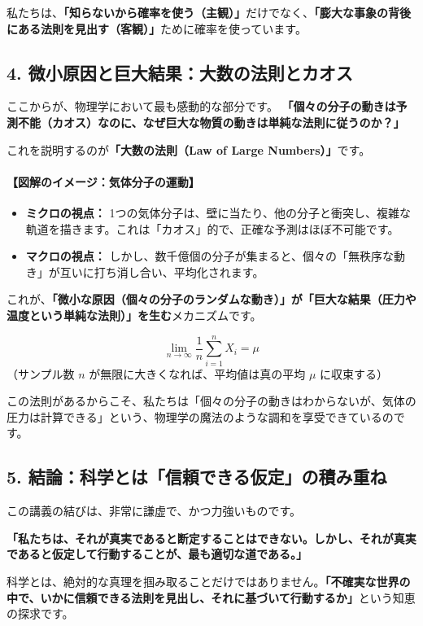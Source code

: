 \documentclass[a4paper,11pt,openany]{ltjsbook}
\begin{document}
\begin{lecturebox}
私たちは、\textbf{「知らないから確率を使う（主観）」}だけでなく、\textbf{「膨大な事象の背後にある法則を見出す（客観）」}ために確率を使っています。

\subsection*{4. 微小原因と巨大結果：大数の法則とカオス}

ここからが、物理学において最も感動的な部分です。
\textbf{「個々の分子の動きは予測不能（カオス）なのに、なぜ巨大な物質の動きは単純な法則に従うのか？」}

これを説明するのが\textbf{「大数の法則（Law of Large Numbers）」}です。

\paragraph{【図解のイメージ：気体分子の運動】}
\begin{itemize}[leftmargin=2em]
\item \textbf{ミクロの視点：} 1つの気体分子は、壁に当たり、他の分子と衝突し、複雑な軌道を描きます。これは「カオス」的で、正確な予測はほぼ不可能です。
\item \textbf{マクロの視点：} しかし、数千億個の分子が集まると、個々の「無秩序な動き」が互いに打ち消し合い、平均化されます。
\end{itemize}

これが、\textbf{「微小な原因（個々の分子のランダムな動き）」が「巨大な結果（圧力や温度という単純な法則）」を生む}メカニズムです。

$$ \lim_{n \to \infty} \frac{1}{n} \sum_{i=1}^{n} X_i = \mu $$
（サンプル数 $n$ が無限に大きくなれば、平均値は真の平均 $\mu$ に収束する）

この法則があるからこそ、私たちは「個々の分子の動きはわからないが、気体の圧力は計算できる」という、物理学の魔法のような調和を享受できているのです。

\subsection*{5. 結論：科学とは「信頼できる仮定」の積み重ね}

この講義の結びは、非常に謙虚で、かつ力強いものです。

\textbf{「私たちは、それが真実であると断定することはできない。しかし、それが真実であると仮定して行動することが、最も適切な道である。」}

科学とは、絶対的な真理を掴み取ることだけではありません。\textbf{「不確実な世界の中で、いかに信頼できる法則を見出し、それに基づいて行動するか」}という知恵の探求です。


\end{lecturebox}
\end{document}

